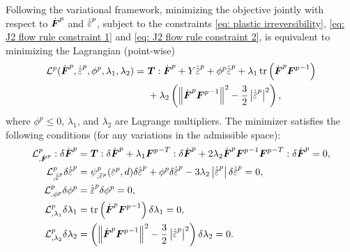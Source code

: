 Following the variational framework, minimizing the objective jointly with respect to $\dot{\boldsymbol{F}}^p$ and $\epdot$, subject to the constraints \eqref{eq: plastic irreversibility}, \eqref{eq: J2 flow rule constraint 1} and \eqref{eq: J2 flow rule constraint 2}, is equivalent to minimizing the Lagrangian (point-wise)
\begin{equation}
  \begin{aligned}
    \mathcal{L}^p(\dot{\defgrad}^p, \epdot, \phi^p, \lambda_1, \lambda_2) = & \ \bfT : \dot{\defgrad}^p + Y \epdot + \phi^p\epdot + \lambda_1\tr\left( \dot{\defgrad}^p{\defgrad^p}^{-1} \right) \\
                                                                            & \ + \lambda_2 \left( \norm{\dot{\defgrad}^p{\defgrad^p}^{-1}}^2 - \frac{3}{2} \abs{\epdot}^2 \right),              
  \end{aligned}
\end{equation}
where $\phi^p \leqslant 0$, $\lambda_1$, and $\lambda_2$ are Lagrange multipliers. The minimizer satisfies the following conditions (for any variations in the admissible space):
\begin{subequations}
  \begin{align}
    \mathcal{L}^p_{, \dot{\defgrad}^p} : \delta \dot{\defgrad}^p & = \bfT : \delta \dot{\defgrad}^p + \lambda_1{\defgrad^p}^{-T} : \delta \dot{\defgrad}^p + 2\lambda_2\dot{\defgrad}^p{\defgrad^p}^{-1}{\defgrad^p}^{-T} : \delta \dot{\defgrad}^p = 0, \label{eq: KKT Fp} \\
    \mathcal{L}^p_{, \epdot}\delta \epdot                        & = \psi^p_{, \ep}(\ep, d) \delta \epdot + \phi^p \delta \epdot - 3 \lambda_2 \abs{\epdot} \delta \epdot = 0, \label{eq: KKT ep}                                                                           \\
    \mathcal{L}^p_{, \phi^p} \delta \phi^p                       & = \epdot \delta \phi^p = 0, \label{eq: KKT lambda1}                                                                                                                                                      \\
    \mathcal{L}^p_{, \lambda_1} \delta \lambda_1                 & = \tr\left( \dot{\defgrad}^p{\defgrad^p}^{-1} \right) \delta \lambda_1 = 0, \label{eq: KKT lambda2}                                                                                                      \\
    \mathcal{L}^p_{, \lambda_2} \delta \lambda_2                 & = \left( \norm{\dot{\defgrad}^p{\defgrad^p}^{-1}}^2 - \frac{3}{2} \abs{\epdot}^2 \right) \delta \lambda_2 = 0. \label{eq: KKT lambda3}                                                                   
  \end{align}
\end{subequations}
